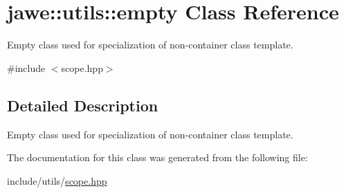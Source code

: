 \hypertarget{classjawe_1_1utils_1_1empty}{}\section{jawe\+:\+:utils\+:\+:empty Class Reference}
\label{classjawe_1_1utils_1_1empty}


Empty class used for specialization of non-\/container class template.  




{\ttfamily \#include $<$scope.\+hpp$>$}



\subsection{Detailed Description}
Empty class used for specialization of non-\/container class template. 

The documentation for this class was generated from the following file\+:\begin{DoxyCompactItemize}
\item 
include/utils/\hyperlink{scope_8hpp}{scope.\+hpp}\end{DoxyCompactItemize}
